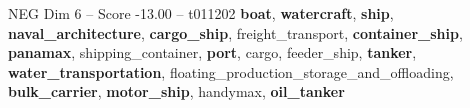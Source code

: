 \begin{textsample}{NEG Dim 6 – Score -13.00 – t011202}  \label{ex:f6_neg_004}
\textbf{boat}, \textbf{watercraft}, \textbf{ship}, \textbf{naval\_architecture}, \textbf{cargo\_ship}, freight\_transport, \textbf{container\_ship}, \textbf{panamax}, shipping\_container, \textbf{port}, cargo, feeder\_ship, \textbf{tanker}, \textbf{water\_transportation}, floating\_production\_storage\_and\_offloading, \textbf{bulk\_carrier}, \textbf{motor\_ship}, handymax, \textbf{oil\_tanker}

\end{textsample}
